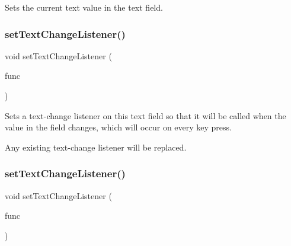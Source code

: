 Sets the current text value in the text field. 

\mbox{\label{classsgl_1_1GTextField_ae41284f9c540110180ac0ad6beca5cb0}} 
\subsubsection{\texorpdfstring{set\+Text\+Change\+Listener()}{setTextChangeListener()}\hspace{0.1cm}{\footnotesize\ttfamily [1/2]}}
{\footnotesize\ttfamily void set\+Text\+Change\+Listener (\begin{DoxyParamCaption}\item[{\mbox{\hyperlink{namespacesgl_ae9f3e9eab70035da1a2b114e21357b25}{G\+Event\+Listener}}}]{func }\end{DoxyParamCaption})\hspace{0.3cm}{\ttfamily [virtual]}}



Sets a text-\/change listener on this text field so that it will be called when the value in the field changes, which will occur on every key press. 

Any existing text-\/change listener will be replaced. \mbox{\label{classsgl_1_1GTextField_ae8df75b0746951146d29220f386fcd33}} 
\subsubsection{\texorpdfstring{set\+Text\+Change\+Listener()}{setTextChangeListener()}\hspace{0.1cm}{\footnotesize\ttfamily [2/2]}}
{\footnotesize\ttfamily void set\+Text\+Change\+Listener (\begin{DoxyParamCaption}\item[{\mbox{\hyperlink{namespacesgl_a54427ce97bb1c2804e4fe2b0a62e8b17}{G\+Event\+Listener\+Void}}}]{func }\end{DoxyParamCaption})\hspace{0.3cm}{\ttfamily [virtual]}}




